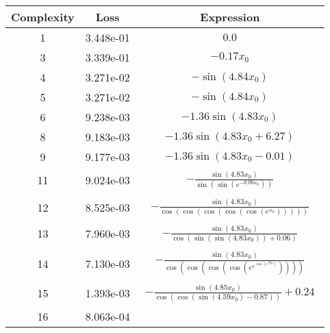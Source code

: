 \begin{center}
        \begin{tabular}{|c|c|c|}
        \hline
        Complexity & Loss & Expression \\
        \hline
        1 & 3.448e-01 & $\begin{aligned}0.0\end{aligned}$\\ \hline3 & 3.339e-01 & $\begin{aligned}- 0.17 x_{0}\end{aligned}$\\ \hline4 & 3.271e-02 & $\begin{aligned}- \sin{\left(4.84 x_{0} \right)}\end{aligned}$\\ \hline5 & 3.271e-02 & $\begin{aligned}- \sin{\left(4.84 x_{0} \right)}\end{aligned}$\\ \hline6 & 9.238e-03 & $\begin{aligned}- 1.36 \sin{\left(4.83 x_{0} \right)}\end{aligned}$\\ \hline8 & 9.183e-03 & $\begin{aligned}- 1.36 \sin{\left(4.83 x_{0} + 6.27 \right)}\end{aligned}$\\ \hline9 & 9.177e-03 & $\begin{aligned}- 1.36 \sin{\left(4.83 x_{0} - 0.01 \right)}\end{aligned}$\\ \hline11 & 9.024e-03 & $\begin{aligned}- \frac{\sin{\left(4.83 x_{0} \right)}}{\sin{\left(\sin{\left(e^{- 0.06 x_{0}} \right)} \right)}}\end{aligned}$\\ \hline12 & 8.525e-03 & $\begin{aligned}- \frac{\sin{\left(4.83 x_{0} \right)}}{\cos{\left(\cos{\left(\cos{\left(\cos{\left(\cos{\left(e^{x_{0}} \right)} \right)} \right)} \right)} \right)}}\end{aligned}$\\ \hline13 & 7.960e-03 & $\begin{aligned}- \frac{\sin{\left(4.83 x_{0} \right)}}{\cos{\left(\sin{\left(\sin{\left(4.83 x_{0} \right)} \right)} + 0.06 \right)}}\end{aligned}$\\ \hline14 & 7.130e-03 & $\begin{aligned}- \frac{\sin{\left(4.83 x_{0} \right)}}{\cos{\left(\cos{\left(\cos{\left(\cos{\left(e^{e^{\cos{\left(e^{x_{0}} \right)}}} \right)} \right)} \right)} \right)}}\end{aligned}$\\ \hline15 & 1.393e-03 & $\begin{aligned}- \frac{\sin{\left(4.85 x_{0} \right)}}{\cos{\left(\cos{\left(\sin{\left(4.59 x_{0} \right)} - 0.87 \right)} \right)}} + 0.24\end{aligned}$\\ \hline16 & 8.063e-04 & 
\end{tabular}
\end{center}
